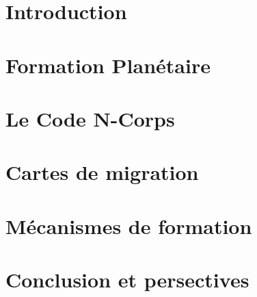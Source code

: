 \documentclass[logos,chaptertoc]{bordeaux-thesis}
\begin{document}
\newpage


\pagestyle{fancy}

\chapter*{Introduction}



\chapter{Formation Planétaire}\label{sec:chap1}


\chapter{Le Code N-Corps}\label{sec:code_n-corps}\label{sec:chap2}



\chapter{Cartes de migration}\label{sec:chap3}



\chapter{Mécanismes de formation}\label{sec:chap4}



\chapter{Conclusion et persectives}\label{sec:discussion}



\adjustmtc %

\printindex
\mtcfixindex[chapter] %
\end{document}

